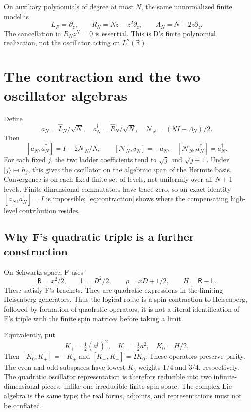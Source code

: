 \documentclass[11pt,reqno]{amsart}
\theoremstyle{remark}\newtheorem{remark}[proposition]{Remark}
\newcommand{\R}{\mathbb R}\newcommand{\F}{\mathcal F}
\newcommand{\Id}{I}\newcommand{\NN}{\mathcal N}
\begin{document}
On auxiliary polynomials of degree at most $N$, the same unnormalized
finite model is
\[
 L_N=\partial_z,\qquad R_N=Nz-z^2\partial_z,\qquad
 \Lambda_N=N-2z\partial_z.
\]
The cancellation in $R_Nz^N=0$ is essential. This is D's finite
polynomial realization, not the oscillator acting on $L^2(\R)$.

\section{The contraction and the two oscillator algebras}\label{sec:contraction}
Define
\[
 a_N=\widehat L_N/\sqrt N,\quad
 a_N^\dagger=\widehat R_N/\sqrt N,\quad
 \NN_N=(N\Id-\Lambda_N)/2.
\]
Then
\begin{equation}\label{eq:contraction}
 [a_N,a_N^\dagger]=\Id-2\NN_N/N,
 \qquad [\NN_N,a_N]=-a_N,\quad
 [\NN_N,a_N^\dagger]=a_N^\dagger.
\end{equation}
For each fixed $j$, the two ladder coefficients tend to $\sqrt j$ and
$\sqrt{j+1}$. Under $|j\rangle\mapsto h_j$, this gives the oscillator
on the algebraic span of the Hermite basis. Convergence is on each
fixed finite set of levels, not uniformly over all $N+1$ levels.
Finite-dimensional commutators have trace zero, so an exact identity
$[a_N,a_N^\dagger]=\Id$ is impossible; \eqref{eq:contraction} shows
where the compensating high-level contribution resides.

\subsection{Why F's quadratic triple is a further construction}
On Schwartz space, F uses
\begin{equation}\label{eq:quadratic}
 \mathsf R=x^2/2,\qquad \mathsf L=D^2/2,\qquad \rho=xD+1/2,
 \qquad H=\mathsf R-\mathsf L.
\end{equation}
These satisfy F's brackets. They are quadratic expressions in the
limiting Heisenberg generators. Thus the logical route is a spin
contraction to Heisenberg, followed by formation of quadratic operators;
it is not a literal identification of F's triple with the finite spin
matrices before taking a limit.

Equivalently, put
\[
 K_+=\tfrac12(a^\dagger)^2,\quad K_-=\tfrac12a^2,\quad K_0=H/2.
\]
Then $[K_0,K_\pm]=\pm K_\pm$ and $[K_-,K_+]=2K_0$.
These operators preserve parity. The even and odd subspaces have lowest
$K_0$ weights $1/4$ and $3/4$, respectively. The quadratic oscillator
representation is therefore reducible into two infinite-dimensional
pieces, unlike one irreducible finite spin space. The complex Lie
algebra is the same type; the real forms, adjoints, and representations
must not be conflated.
\end{document}
